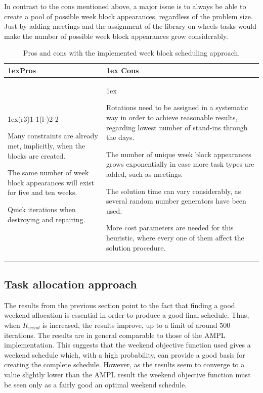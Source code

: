 In contrast to the cons mentioned above, a major issue is to always be able to create a pool of possible week block appearances, regardless of the problem size. Just by adding meetings and the assignment of the library on wheels tasks would make the number of possible week block appearances grow considerably.

\begin{table}[H]
\caption{Pros and cons with the implemented week block scheduling approach.}
\label{tab:pros_cons_weekly_scheduling}
\begin{tabularx}{\linewidth}{>{\parskip1ex}X@{\kern4\tabcolsep}>{\parskip1ex}X}
\toprule
\hfil\bfseries Pros
&
\hfil\bfseries Cons
\\\cmidrule(r{3\tabcolsep}){1-1}\cmidrule(l{-\tabcolsep}){2-2}

Many constraints are already met, implicitly, when the blocks are created. \par
The same number of week block appearances will exist for five and ten weeks.\par
Quick iterations when destroying and repairing.\par

&

Rotations need to be assigned in a systematic way in order to achieve reasonable results, regarding lowest number of stand-ins through the days.\par
The number of unique week block appearances grows exponentially in case more task types are added, such as meetings.\par
The solution time can vary considerably, as several random number generators have been used.\par
More cost parameters are needed for this heuristic, where every one of them affect the solution procedure.

\\\bottomrule
\end{tabularx}
\end{table}

 

\subsection{Task allocation approach}
The results from the previous section point to the fact that finding a good weekend allocation is essential in order to produce a good final schedule. Thus, when $It_{wend}$ is increased, the results improve, up to a limit of around 500 iterations. The results are in general comparable to those of the AMPL implementation. This suggests that the weekend objective function used gives a weekend schedule which, with a high probability, can provide a good basis for creating the complete schedule. However, as the results seem to converge to a value slightly lower than the AMPL result the weekend objective function must be seen only as a fairly good an optimal weekend schedule. 

